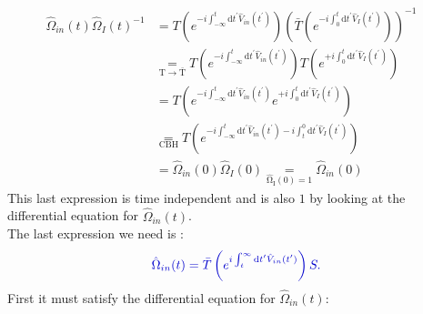 \documentclass[12pt, titlepage]{article}
\begin{document}
\begin{subequations}
\begin{align}
	\hat{\Omega}_{in}(t)\hat{\Omega}_{I}(t)^{-1}&=
T\left( e^{-i\int_{-\infty}^{t}\mathrm{d}t^{\prime} \hat{V}_{in}(t^{\prime})} \right)
 \left( \bar{T}\left( e^{-i\int_{0}^{t}\mathrm{d}t^{\prime} \hat{V}_{I}(t^{\prime})} \right)
	\right)^{-1}
	&\\
	 &\underset{\mathrm{T\rightarrow\bar{T} }}{=} 
	 T\left( e^{-i\int_{-\infty}^{t}\mathrm{d}t^{\prime} \hat{V}_{in}(t^{\prime})} \right)
  T\left( e^{+i\int_{0}^{t}\mathrm{d}t^{\prime} \hat{V}_{I}(t^{\prime})} \right)
  &\\
  &=
  T\left( e^{-i\int_{-\infty}^{t}\mathrm{d}t^{\prime} \hat{V}_{in}(t^{\prime})}
  e^{+i\int_{0}^{t}\mathrm{d}t^{\prime} \hat{V}_{I}(t^{\prime})} \right)
  	&\\
	 &\underset{\mathrm{CBH}}{=} 
T\left( e^{-i\int_{-\infty}^{t}\mathrm{d}t^{\prime} \hat{V}_{in}(t^{\prime})
 -i\int_{t}^{0}\mathrm{d}t^{\prime} \hat{V}_{I}(t^{\prime}) }\right) 
  &\\
  &= 	\hat{\Omega}_{in}(0) 	\hat{\Omega}_{I}(0)\underset{\mathrm{\hat{\Omega}_{I}(0)=1}}{=} 	\hat{\Omega}_{in}(0)
\end{align}
\end{subequations}
This last expression is time independent and is also $ 1 $ by looking at the differential equation for $\hat{\Omega}_{in}(t) $.
\\
The last expression we need is :
\begin{equation}
\textcolor[RGB]{0,0,204}{
\hat{\Omega}_{in}(t)=
\bar{T}
\left( 
 e^{i\int_{t}^{\infty}\mathrm{d}t^{\prime} \hat{V}_{in}(t^{\prime})}
\right) 
S.}
\end{equation}
First it must satisfy the differential equation for $ \hat{\Omega}_{in}(t) $:
\end{document}
